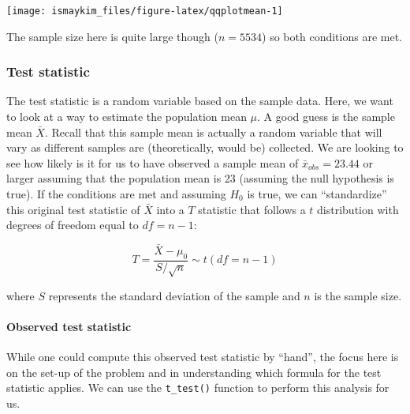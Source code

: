 \documentclass[12pt,]{krantz}
\makeatletter
\newenvironment{Shaded}{\begin{snugshade}}{\end{snugshade}}
\newcommand{\KeywordTok}[1]{\textcolor[rgb]{0.27,0.27,0.27}{\textbf{#1}}}
\newcommand{\DataTypeTok}[1]{\textcolor[rgb]{0.27,0.27,0.27}{#1}}
\newcommand{\DecValTok}[1]{\textcolor[rgb]{0.06,0.06,0.06}{#1}}
\newcommand{\StringTok}[1]{\textcolor[rgb]{0.5,0.5,0.5}{#1}}
\newcommand{\OtherTok}[1]{\textcolor[rgb]{0.37,0.37,0.37}{#1}}
\newcommand{\OperatorTok}[1]{\textcolor[rgb]{0.43,0.43,0.43}{\textbf{#1}}}
\newcommand{\NormalTok}[1]{#1}
\let\oldparagraph\paragraph
\renewcommand{\paragraph}[1]{\oldparagraph{#1}\mbox{}}
\newenvironment{kframe}{%
\medskip{}
\setlength{\fboxsep}{.8em}
 \def\at@end@of@kframe{}%
 \ifinner\ifhmode%
  \def\at@end@of@kframe{\end{minipage}}%
  \begin{minipage}{\columnwidth}%
 \fi\fi%
 \def\FrameCommand##1{\hskip\@totalleftmargin \hskip-\fboxsep
 \colorbox{shadecolor}{##1}\hskip-\fboxsep
     \hskip-\linewidth \hskip-\@totalleftmargin \hskip\columnwidth}%
 \MakeFramed {\advance\hsize-\width
   \@totalleftmargin\z@ \linewidth\hsize
   \@setminipage}}%
 {\par\unskip\endMakeFramed%
 \at@end@of@kframe}
\renewenvironment{Shaded}{\begin{kframe}}{\end{kframe}}
\theoremstyle{definition}
\theoremstyle{definition}
\theoremstyle{definition}
\theoremstyle{remark}
\makeatother
\begin{document}
\begin{center}\texttt{[image: ismaykim\_files/figure-latex/qqplotmean-1]} \end{center}

The sample size here is quite large though (\(n = 5534\)) so both
conditions are met.

\subsubsection*{Test statistic}\label{test-statistic}


The test statistic is a random variable based on the sample data. Here,
we want to look at a way to estimate the population mean \(\mu\). A good
guess is the sample mean \(\bar{X}\). Recall that this sample mean is
actually a random variable that will vary as different samples are
(theoretically, would be) collected. We are looking to see how likely is
it for us to have observed a sample mean of \(\bar{x}_{obs} = 23.44\) or
larger assuming that the population mean is 23 (assuming the null
hypothesis is true). If the conditions are met and assuming \(H_0\) is
true, we can ``standardize'' this original test statistic of \(\bar{X}\)
into a \(T\) statistic that follows a \(t\) distribution with degrees of
freedom equal to \(df = n - 1\):

\[ T =\dfrac{ \bar{X} - \mu_0}{ S / \sqrt{n} } \sim t (df = n - 1) \]

where \(S\) represents the standard deviation of the sample and \(n\) is
the sample size.

\paragraph{Observed test statistic}\label{observed-test-statistic}

While one could compute this observed test statistic by ``hand'', the
focus here is on the set-up of the problem and in understanding which
formula for the test statistic applies. We can use the
\texttt{t\_test()} function to perform this analysis for us.

\begin{Shaded}
\end{Shaded}
\end{document}
